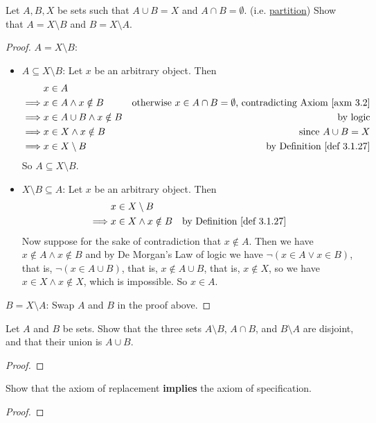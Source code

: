 \begin{exercise}\label{exercise 3.1.9}
Let \(A, B, X\) be sets such that \(A \cup B = X\) and \(A \cap B = \emptyset\). (i.e. \href{https://www.wikiwand.com/en/Partition_of_a_set}{partition}) Show that \(A = X \setminus B\) and \(B = X \setminus A\).
\end{exercise}

\begin{proof}
\(A = X \setminus B\):
\begin{itemize}
    \item \(A \subseteq X \setminus B\): Let \(x\) be an arbitrary object. Then
        \begin{align*}
                 & x \in A \\
        \implies & x \in A \land x \notin B & \text{otherwise \(x \in A \cap B = \emptyset\), contradicting \AXM{3.2}} \\
        \implies & x \in A \cup B \land x \notin B & \text{by logic} \\
        \implies & x \in X \land x \notin B & \text{since \(A \cup B = X\)} \\
        \implies & x \in X \setminus B & \text{by \DEF{3.1.27}}
        \end{align*}
        So \(A \subseteq X \setminus B\).
    \item \(X \setminus B \subseteq A\): Let \(x\) be an arbitrary object. Then
        \begin{align*}
                 & x \in X \setminus B \\
        \implies & x \in X \land x \notin B & \text{by \DEF{3.1.27}} \\
        \end{align*}
        Now suppose for the sake of contradiction that \(x \notin A\). Then we have \(x \notin A \land x \notin B\) and by De Morgan's Law of logic we have \(\lnot (x \in A \lor x \in B)\), that is, \(\lnot (x \in A \cup B)\), that is, \(x \notin A \cup B\), that is, \(x \notin X\), so we have \(x \in X \land x \notin X\), which is impossible. So \(x \in A\).
\end{itemize}

\(B = X \setminus A\): Swap \(A\) and \(B\) in the proof above.
\end{proof}

\begin{exercise}\label{exercise 3.1.10}
Let \(A\) and \(B\) be sets. Show that the three sets \(A \setminus B\), \(A \cap B\), and \(B \setminus A\) are disjoint, and that their union is \(A \cup B\).
\end{exercise}

\begin{proof}
\end{proof}

\begin{exercise}\label{exercise 3.1.11}
Show that the axiom of replacement \textbf{implies} the axiom of specification.
\end{exercise}

\begin{proof}
\end{proof}